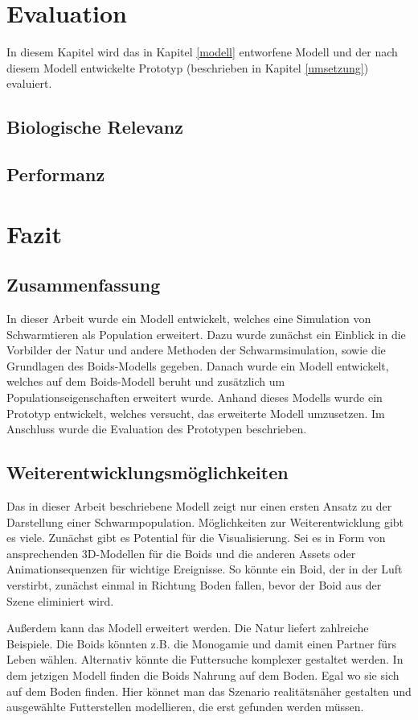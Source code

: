 \documentclass[draft=false
              ,paper=a4
              ,twoside=false
              ,fontsize=11pt
              ,headsepline
              ,BCOR10mm
              ,DIV11
              ,bibtotoc
              ,liststotoc
              ]{scrbook}
\begin{document}
\chapter{Evaluation}\label{eval}
In diesem Kapitel wird das in Kapitel \ref{modell} entworfene Modell und der nach diesem Modell entwickelte Prototyp (beschrieben in Kapitel \ref{umsetzung}) evaluiert.
\section{Biologische Relevanz}
\section{Performanz}

\chapter{Fazit}\label{fazit}
\section{Zusammenfassung}
In dieser Arbeit wurde ein Modell entwickelt, welches eine Simulation von Schwarmtieren als Population erweitert. Dazu wurde zunächst ein Einblick in die Vorbilder der Natur und andere Methoden der Schwarmsimulation, sowie die Grundlagen des Boids-Modells gegeben. Danach wurde ein Modell entwickelt, welches auf dem Boids-Modell beruht und zusätzlich um Populationseigenschaften erweitert wurde. Anhand dieses Modells wurde ein Prototyp entwickelt, welches versucht, das erweiterte Modell umzusetzen. Im Anschluss wurde die Evaluation des Prototypen beschrieben.
\section{Weiterentwicklungsmöglichkeiten}
Das in dieser Arbeit beschriebene Modell zeigt nur einen ersten Ansatz zu der Darstellung einer Schwarmpopulation. Möglichkeiten zur Weiterentwicklung gibt es viele.
Zunächst gibt es Potential für die Visualisierung. Sei es in Form von ansprechenden 3D-Modellen für die Boids und die anderen Assets oder Animationsequenzen für wichtige Ereignisse. So könnte ein Boid, der in der Luft verstirbt, zunächst einmal in Richtung Boden fallen, bevor der Boid aus der Szene eliminiert wird.

Außerdem kann das Modell erweitert werden. Die Natur liefert zahlreiche Beispiele. Die Boids könnten z.B. die Monogamie und damit einen Partner fürs Leben wählen. Alternativ könnte die Futtersuche komplexer gestaltet werden. In dem jetzigen Modell finden die Boids Nahrung auf dem Boden. Egal wo sie sich auf dem Boden finden. Hier könnet man das Szenario realitätsnäher gestalten und ausgewählte Futterstellen modellieren, die erst gefunden werden müssen.
\end{document}
